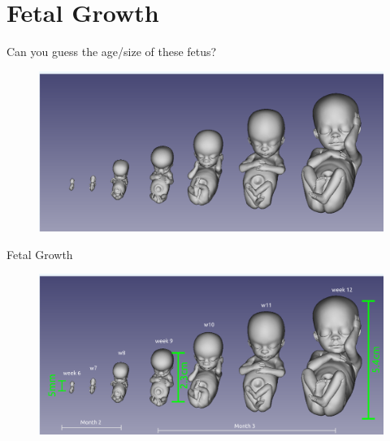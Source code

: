 \section{Fetal Growth}



{
\begin{frame}{Can you guess the age/size of these fetus?}
      \begin{figure}
        \centering
        \includegraphics[width=1.0\textwidth]{./figures/fetal-ages/versions/drawing-v00.png}
      \end{figure}
\end{frame}
}

{
\begin{frame}{Fetal Growth}
      \begin{figure}
        \centering
        \includegraphics[width=1.0\textwidth]{./figures/fetal-ages/versions/drawing-v01.png}
      \end{figure}
\end{frame}
}


